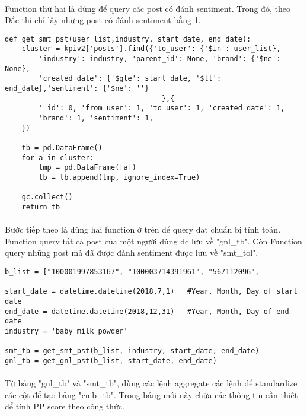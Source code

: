 \documentclass[12pt]{article}
\numberwithin{equation}{section}
\begin{document}
\paragraph{} Function thứ hai là dùng để query các post có đánh sentiment. Trong đó, theo Đắc thì chỉ lấy những post có đánh sentiment bằng 1.
\begin{lstlisting}
def get_smt_pst(user_list,industry, start_date, end_date):
    cluster = kpiv2['posts'].find({'to_user': {'$in': user_list},
        'industry': industry, 'parent_id': None, 'brand': {'$ne': None},
        'created_date': {'$gte': start_date, '$lt': end_date},'sentiment': {'$ne': ''}
                                     },{
        '_id': 0, 'from_user': 1, 'to_user': 1, 'created_date': 1,
        'brand': 1, 'sentiment': 1,
    })

    tb = pd.DataFrame()
    for a in cluster:
        tmp = pd.DataFrame([a])
        tb = tb.append(tmp, ignore_index=True)

    gc.collect()
    return tb
\end{lstlisting}

\paragraph{} Bước tiếp theo là dùng hai function ở trên để query dat chuẩn bị tính toán. Function query tất cả post của một người dùng đc lưu về "gnl\_tb". Còn Function query những post mà đã được đánh sentiment được lưu về "smt\_tol".

\begin{lstlisting}
b_list = ["100001997853167", "100003714391961", "567112096",

start_date = datetime.datetime(2018,7,1)   #Year, Month, Day of start date
end_date = datetime.datetime(2018,12,31)   #Year, Month, Day of end date
industry = 'baby_milk_powder'

smt_tb = get_smt_pst(b_list, industry, start_date, end_date)
gnl_tb = get_gnl_pst(b_list, start_date, end_date)
\end{lstlisting}

\paragraph{} Từ bảng "gnl\_tb" và "smt\_tb", dùng các lệnh aggregate các lệnh để standardize các cột để tạo bảng "cmb\_tb". Trong bảng mới này chứa các thông tin cần thiết để tính PP score theo công thức.
\end{document}
